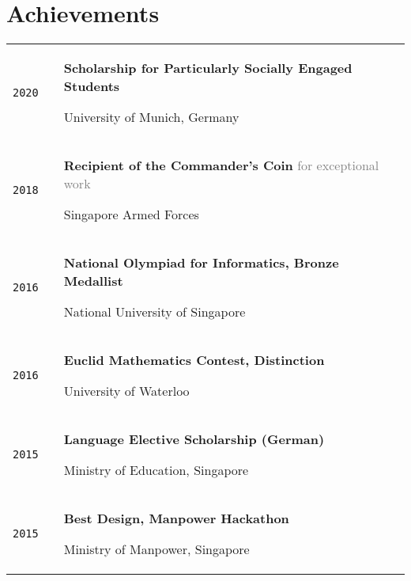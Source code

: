 \section{\textcolor{section_2}{Achievements}}
\vspace{-\parskip}
{
	\ff
	\renewcommand{\arraystretch}{1.9}
	\begin{tabularx}{\textwidth}{@{}l p{0.3cm} X@{}}
		\texttt{\large 2020} & & \textbf{Scholarship for Particularly Socially Engaged Students} \par {\ff University of Munich, Germany} \\[-0.5em]
		\texttt{\large 2018} & & \textbf{Recipient of the Commander's Coin} \hfill \textcolor{gray}{\ff for exceptional work} \par {\ff Singapore Armed Forces}  \\[-0.5em]
		\texttt{\large 2016} & & \textbf{National Olympiad for Informatics, Bronze Medallist} \par {\ff National University of Singapore} \\[-0.5em]
		\texttt{\large 2016} & & \textbf{Euclid Mathematics Contest, Distinction} \par {\ff University of Waterloo} \\[-0.5em]
		\texttt{\large 2015} & & \textbf{Language Elective Scholarship (German)} \par {\ff Ministry of Education, Singapore} \\[-0.5em]
		\texttt{\large 2015} & & \textbf{Best Design, Manpower Hackathon} \par {\ff Ministry of Manpower, Singapore} \\[-0.5em]
	\end{tabularx}
}

